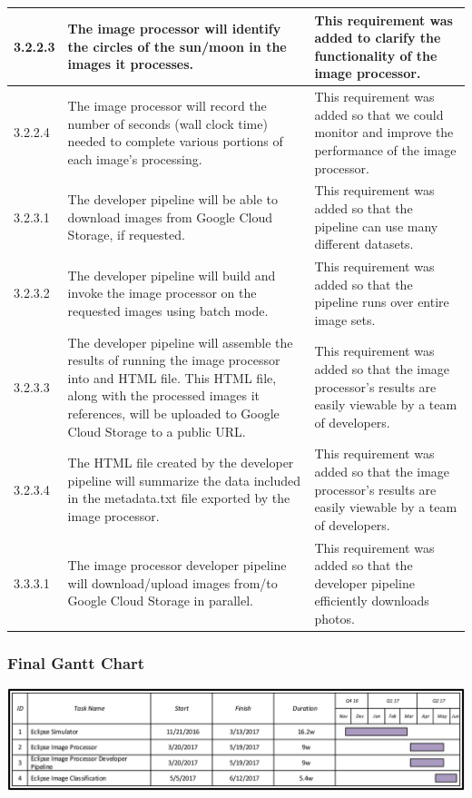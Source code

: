 \documentclass[10pt, onecolumn, draftclsnofoot, letterpaper, compsoc]{IEEEtran}
\begin{document}
\begin{longtable}{| p{} | p{} | p{} |}
    3.2.2.3 &
	The image processor will identify the circles of the sun/moon in the images it processes. &
	This requirement was added to clarify the functionality of the image processor.
	\\ \hline

    3.2.2.4 &
    The image processor will record the number of seconds (wall clock time) needed to complete various
    portions of each image’s processing. &
	This requirement was added so that we could monitor and improve the performance of the image processor.
	\\ \hline

    3.2.3.1 &
	The developer pipeline will be able to download images from Google Cloud Storage, if requested. &
	This requirement was added so that the pipeline can use many different datasets.
	\\ \hline

    3.2.3.2 &
    The developer pipeline will build and invoke the image processor on the requested images using batch mode. &
	This requirement was added so that the pipeline runs over entire image sets.
	\\ \hline

    3.2.3.3 &
    The developer pipeline will assemble the results of running the image processor into and HTML file. This
    HTML file, along with the processed images it references, will be uploaded to Google Cloud Storage to a
    public URL. &
	This requirement was added so that the image processor's results are easily viewable by a team of developers.
	\\ \hline

    3.2.3.4 &
    The HTML file created by the developer pipeline will summarize the data included in the metadata.txt file
    exported by the image processor. &
	This requirement was added so that the image processor's results are easily viewable by a team of developers.
	\\ \hline

    3.3.3.1 &
    The image processor developer pipeline will download/upload images from/to Google Cloud Storage in parallel. &
	This requirement was added so that the developer pipeline efficiently downloads photos.
	\\ \hline

\end{longtable}

\subsubsection{Final Gantt Chart}
\vspace{2mm}
\includegraphics[width=\textwidth]{finalganttchart.pdf}
\end{document}
